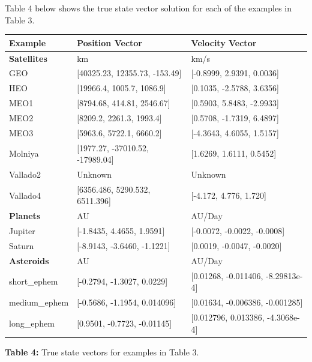 \documentclass{article}
\begin{document}
		Table 4 below shows the true state vector solution for each of the examples in Table 3.

		\begin{center}
		\begin{tabular}{|p{3cm}|p{5cm}|p{5cm}|}
		\hline
		\sc \textbf{Example} & \sc \textbf{Position Vector} & \sc \textbf{Velocity Vector}\\ \hline
		\textbf{Satellites} & km & km/s\\ \hline
		GEO & [40325.23, 12355.73, -153.49] & [-0.8999, 2.9391, 0.0036]\\ \hline
		HEO & [19966.4, 1005.7, 1086.9] & [0.1035, -2.5788, 3.6356]\\ \hline
		MEO1 & [8794.68, 414.81, 2546.67] & [0.5903, 5.8483, -2.9933]\\ \hline
		MEO2 & [8209.2, 2261.3, 1993.4] & [0.5708, -1.7319, 6.4897]\\ \hline
		MEO3 & [5963.6, 5722.1, 6660.2] & [-4.3643, 4.6055, 1.5157]\\ \hline
		Molniya & [1977.27, -37010.52, -17989.04] & [1.6269, 1.6111, 0.5452]\\ \hline
		Vallado2 & Unknown & Unknown\\ \hline
		Vallado4 & [6356.486, 5290.532, 6511.396] & [-4.172, 4.776, 1.720]\\ \hline
		\textbf{Planets} & AU & AU/Day\\ \hline
		Jupiter & [-1.8435, 4.4655, 1.9591] & [-0.0072, -0.0022, -0.0008]\\ \hline
		Saturn & [-8.9143, -3.6460, -1.1221] & [0.0019, -0.0047, -0.0020]\\ \hline
		\textbf{Asteroids} & AU & AU/Day\\ \hline
		short\_ephem & [-0.2794, -1.3027, 0.0229] & [0.01268, -0.011406, -8.29813e-4]\\ \hline
		medium\_ephem & [-0.5686, -1.1954, 0.014096] & [0.01634, -0.006386, -0.001285]\\ \hline
		long\_ephem & [0.9501, -0.7723, -0.01145] & [0.012796, 0.013386, -4.3068e-4]\\ \hline
		\end{tabular}
		\newline \newline
		\textbf{Table 4:} True state vectors for examples in Table 3.
		\end{center}

	\newpage
\end{document}
